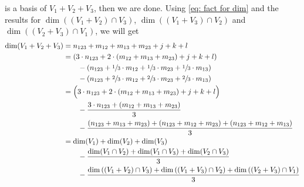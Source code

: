 \begin{xrcs}
is a basis of $V_1 + V_2 + V_3$, then we are done. Using \eqref{eq: fact for dim} and the results for $\dim ((V_1+V_2) \cap V_3)$, $\dim ((V_1+V_3) \cap V_2)$ and $\dim ((V_2+V_3) \cap V_1)$, we will get
\[
\begin{aligned}
  \dim (V_1 + V_2 + V_3) & = n_{123} + m_{12} + m_{13} + m_{23} + j + k + l \\
  & = \left(3 \cdot n_{123} + 2 \cdot (m_{12}+m_{13}+m_{23})+j+k+l \right) \\
  & \qquad - \left(n_{123} + \sfrac{1}{3} \cdot m_{12} + \sfrac{1}{3} \cdot m_{23} + \sfrac{1}{3} \cdot m_{13} \right) \\
  & \qquad - \left(n_{123}+\sfrac{2}{3} \cdot m_{12} + \sfrac{2}{3} \cdot m_{23} + \sfrac{2}{3} \cdot m_{13} \right) \\
  & = \Big(3 \cdot n_{123} + 2 \cdot (m_{12}+m_{13}+m_{23})+j+k+l \Big) \\
  & \qquad - \frac{3 \cdot n_{123}+(m_{12}+m_{13}+m_{23}) }{3} \\
  & \qquad - \frac{(n_{123} + m_{13} + m_{23})+(n_{123} + m_{12} + m_{23})+(n_{123} + m_{12} + m_{13})}{3} \\
  & = \dim (V_1) + \dim (V_2) + \dim (V_3) \\
  & \qquad - \frac{\dim (V_1 \cap V_2) + \dim (V_1 \cap V_3) + \dim (V_2 \cap V_3)}{3} \\
  & \qquad - \frac{ \dim \left(  (V_1 + V_2) \cap V_3 \right) + \dim \left( (V_1 + V_3) \cap V_2 \right)+ \dim \left( (V_2 + V_3) \cap V_1 \right) }{3} \\
\end{aligned}
\]



\end{xrcs}
